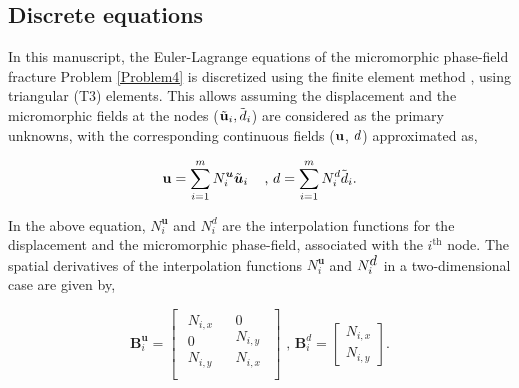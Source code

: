 \documentclass[11pt]{article}
\begin{document}
\subsection{Discrete equations}\label{sec:DELinElast}

In this manuscript, the Euler-Lagrange equations of the micromorphic phase-field fracture Problem \ref{Problem4} is discretized using the finite element method \cite{zienkiewicz1977finite,hughes2012finite}, using triangular (T3) elements. This allows assuming the displacement and the micromorphic fields at the nodes ($\tilde{\hbox{$\mathbf{u}$}}_i,\tilde{\hbox{$d$}}_i$) are considered as the primary unknowns, with the corresponding continuous fields ($\hbox{$\mathbf{u}$}$, $\hbox{$d$}$) approximated as, 

\begin{equation}\label{eqn:discrete_disp_mpf}
  \hbox{$\mathbf{u}$} = \sum\limits_{i = 1}^m {N_i^{\boldsymbol{u}}\tilde{\boldsymbol{u}}_i}\;\;\;\text{ , }
\hbox{$d$} = \sum\limits_{i = 1}^m N_i^{d}\tilde{\hbox{$d$}}_i.
\end{equation}

\noindent In the above equation, $N_i^{\boldsymbol{u}}$ and $N_i^{d}$ are the interpolation functions for the displacement and the micromorphic phase-field, associated with the $i^{\text{th}}$ node. The spatial derivatives of the interpolation functions $N_i^{\boldsymbol{u}}$ and $N_i^{\hbox{$d$}}$ in a two-dimensional case are given by,

\begin{equation}\label{eqn:Bmatrices}
    \mathbf{B}_i^{\boldsymbol{u}} = \left[ {\begin{array}{*{20}{c}}
  {\begin{array}{*{20}{c}}
  {{N_{i,x}}} \\ 
  0 \\ 
  {{N_{i,y}}}\\
\end{array}}&{\begin{array}{*{20}{c}}
  0 \\ 
  {{N_{i,y}}} \\ 
  {{N_{i,x}}} \\
\end{array}}
\end{array}} \right] \text{ , } 
\mathbf{B}_i^{d}  = \left[ {\begin{array}{*{20}{c}}
  {{N_{i,x}}} \\ 
  {{N_{i,y}}}
\end{array}} \right].
\end{equation}
\end{document}

